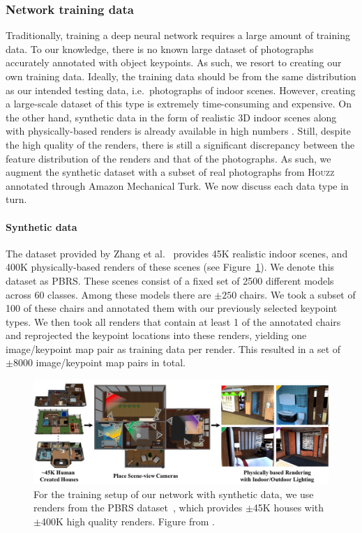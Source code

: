 \documentclass[10pt,twocolumn,letterpaper]{article}
\begin{document}
\subsubsection{Network training data}
Traditionally, training a deep neural network requires a large amount of
training data.  To our knowledge, there is no known large dataset of
photographs accurately annotated with object keypoints. As such, we resort
to creating our own training data. Ideally, the training data should be
from the same distribution as our intended testing data, i.e.\ photographs
of indoor scenes. However, creating a large-scale dataset of this type
is extremely time-consuming and expensive. On the other hand, synthetic
data in the form of realistic 3D indoor scenes along with physically-based
renders is already available in high numbers \cite{Zhang:2017:CVPR}.
Still, despite the high quality of the renders, there is still a significant
discrepancy between the feature distribution of the renders and that of the
photographs. As such, we augment the synthetic dataset with a subset of real
photographs from \textsc{Houzz} annotated through Amazon Mechanical Turk. We
now discuss each data type in turn.

\paragraph{Synthetic data}
The dataset provided by Zhang et al.~\cite{Zhang:2017:CVPR} provides 45K realistic indoor
scenes, and 400K physically-based renders of these scenes (see Figure~\ref{fig:ch4:pbrs}). We denote this
dataset as \textsc{PBRS}. These scenes consist of a fixed set of 2500 different
models across 60 classes. Among these models there are $\pm250$ chairs. We took a
subset of 100 of these chairs and annotated them with our previously selected
keypoint types. We then took all renders that contain at least 1 of the
annotated chairs and reprojected the keypoint locations into these renders,
yielding one image/keypoint map pair as training data per render. This resulted
in a set of $\pm8000$ image/keypoint map pairs in total.

\begin{figure}
    \includegraphics[width=\linewidth]{figures/pbrs/pbrs}
    \caption[PBRS dataset]{For the training setup of our network with synthetic data, we use renders from the PBRS dataset~\cite{Zhang:2017:CVPR}, which provides $\pm$45K houses with $\pm$400K high quality renders. Figure from \cite{Zhang:2017:CVPR}.}
    \label{fig:ch4:pbrs}
\end{figure}
\end{document}
